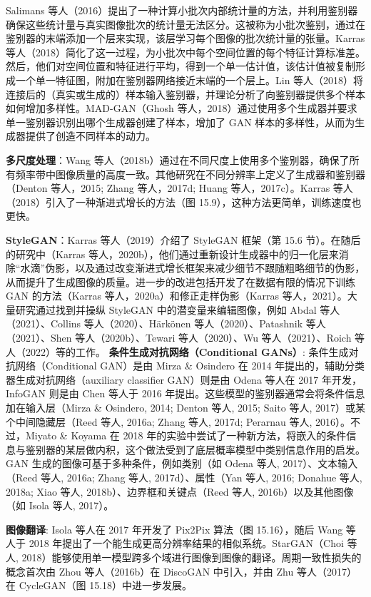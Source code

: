 Salimans 等人（2016）提出了一种计算小批次内部统计量的方法，并利用鉴别器确保这些统计量与真实图像批次的统计量无法区分。这被称为小批次鉴别，通过在鉴别器的末端添加一个层来实现，该层学习每个图像的批次统计量的张量。Karras 等人（2018）简化了这一过程，为小批次中每个空间位置的每个特征计算标准差。然后，他们对空间位置和特征进行平均，得到一个单一估计值，该估计值被复制形成一个单一特征图，附加在鉴别器网络接近末端的一个层上。Lin 等人（2018）将连接后的（真实或生成的）样本输入鉴别器，并理论分析了向鉴别器提供多个样本如何增加多样性。MAD-GAN（Ghosh 等人，2018）通过使用多个生成器并要求单一鉴别器识别出哪个生成器创建了样本，增加了 GAN 样本的多样性，从而为生成器提供了创造不同样本的动力。

\textbf{多尺度处理}：Wang 等人（2018b）通过在不同尺度上使用多个鉴别器，确保了所有频率带中图像质量的高度一致。其他研究在不同分辨率上定义了生成器和鉴别器（Denton 等人，2015; Zhang 等人，2017d; Huang 等人，2017c）。Karras 等人（2018）引入了一种渐进式增长的方法（图 15.9），这种方法更简单，训练速度也更快。

\textbf{StyleGAN}：Karras 等人（2019）介绍了 StyleGAN 框架（第 15.6 节）。在随后的研究中（Karras 等人，2020b），他们通过重新设计生成器中的归一化层来消除“水滴”伪影，以及通过改变渐进式增长框架来减少细节不跟随粗略细节的伪影，从而提升了生成图像的质量。进一步的改进包括开发了在数据有限的情况下训练 GAN 的方法（Karras 等人，2020a）和修正走样伪影（Karras 等人，2021）。大量研究通过找到并操纵 StyleGAN 中的潜变量来编辑图像，例如 Abdal 等人（2021）、Collins 等人（2020）、Härkönen 等人（2020）、Patashnik 等人（2021）、Shen 等人（2020b）、Tewari 等人（2020）、Wu 等人（2021）、Roich 等人（2022）等的工作。
\textbf{条件生成对抗网络（Conditional GANs）}: 条件生成对抗网络（Conditional GAN）是由 Mirza \& Osindero 在 2014 年提出的，辅助分类器生成对抗网络（auxiliary classifier GAN）则是由 Odena 等人在 2017 年开发，InfoGAN 则是由 Chen 等人于 2016 年提出。这些模型的鉴别器通常会将条件信息加在输入层（Mirza \& Osindero, 2014; Denton 等人, 2015; Saito 等人, 2017）或某个中间隐藏层（Reed 等人, 2016a; Zhang 等人, 2017d; Perarnau 等人, 2016）。不过，Miyato \& Koyama 在 2018 年的实验中尝试了一种新方法，将嵌入的条件信息与鉴别器的某层做内积，这个做法受到了底层概率模型中类别信息作用的启发。GAN 生成的图像可基于多种条件，例如类别（如 Odena 等人, 2017）、文本输入（Reed 等人, 2016a; Zhang 等人, 2017d）、属性（Yan 等人, 2016; Donahue 等人, 2018a; Xiao 等人, 2018b）、边界框和关键点（Reed 等人, 2016b）以及其他图像（如 Isola 等人, 2017）。

\textbf{图像翻译}: Isola 等人在 2017 年开发了 Pix2Pix 算法（图 15.16），随后 Wang 等人于 2018 年提出了一个能生成更高分辨率结果的相似系统。StarGAN（Choi 等人, 2018）能够使用单一模型跨多个域进行图像到图像的翻译。周期一致性损失的概念首次由 Zhou 等人（2016b）在 DiscoGAN 中引入，并由 Zhu 等人（2017）在 CycleGAN（图 15.18）中进一步发展。

